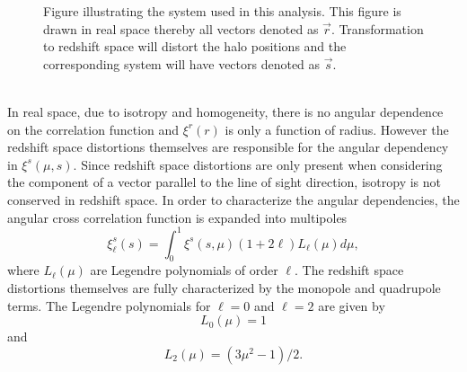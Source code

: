 \begin{figure}
    
    \caption{Figure illustrating the system used in this analysis. This
    figure is drawn in real space thereby all vectors denoted as $\vec{r}$.
    Transformation to redshift space will distort the halo positions and the
    corresponding system will have vectors denoted as $\vec{s}$.}
    \label{fig:corrpair}
\end{figure}
\\\indent
In real space, due to isotropy and homogeneity, there is no angular dependence on the correlation function and $\xi^r(r)$ is only a function of radius. However the redshift space distortions themselves are responsible for the angular dependency in $\xi^s(\mu,s)$. Since redshift space distortions are only present when considering the component of a vector parallel to the line of sight direction, isotropy is not conserved in redshift space. In order to characterize the angular dependencies, the angular cross correlation function is expanded into multipoles\cite{Nadathur_corr}
\begin{equation}
    \xi^s_\ell(s)=\int_0^1\xi^s(s,\mu)(1+2\ell)L_\ell(\mu)d\mu,
\end{equation}
where $L_\ell(\mu)$ are Legendre polynomials
of order $\ell$. The redshift space distortions themselves are fully characterized by the monopole and quadrupole terms\cite{Hamaus_2017}. The Legendre polynomials for $\ell=0$ and
$\ell=2$ are given by
\begin{equation}
    L_0(\mu)=1
\end{equation}
and
\begin{equation}
    L_2(\mu)=(3\mu^2-1)/2.
\end{equation}
